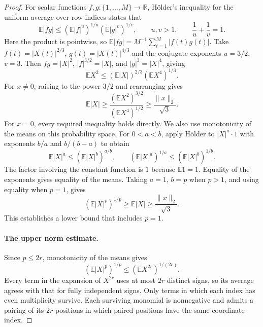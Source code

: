 \documentclass[11pt,letterpaper]{article}
\numberwithin{equation}{section}
\theoremstyle{definition}
\theoremstyle{remark}
\newcommand{\R}{\mathbb R}
\newcommand{\E}{\mathbb E}
\begin{document}
\begin{proof}
For scalar functions $f,g:\{1,\ldots,M\}\to\R$, H\"older's inequality for the uniform average over row indices states that
\[
 \E|fg|\le(\E|f|^u)^{1/u}(\E|g|^v)^{1/v},
 \qquad u,v>1,\qquad \frac1u+\frac1v=1.
\]
Here the product is pointwise, so $\E|fg|=M^{-1}\sum_{t=1}^M|f(t)g(t)|$. Take $f(t)=|X(t)|^{2/3}$, $g(t)=|X(t)|^{4/3}$ and the conjugate exponents $u=3/2$, $v=3$. Then $fg=|X|^2$, $|f|^{3/2}=|X|$, and $|g|^3=|X|^4$, giving
\[
 \E X^2\le(\E|X|)^{2/3}(\E X^4)^{1/3}.
\]
For $x\ne0$, raising to the power $3/2$ and rearranging gives
\[
 \E|X|\ge\frac{(\E X^2)^{3/2}}{(\E X^4)^{1/2}}
 \ge\frac{\|x\|_2}{\sqrt3}.
\]
For $x=0$, every required inequality holds directly. We also use monotonicity of the means on this probability space. For $0<a<b$, apply H\"older to $|X|^a\cdot1$ with exponents $b/a$ and $b/(b-a)$ to obtain
\[
 \E|X|^a\le(\E|X|^b)^{a/b},
 \qquad (\E|X|^a)^{1/a}\le(\E|X|^b)^{1/b}.
\]
The factor involving the constant function is $1$ because $\E1=1$. Equality of the exponents gives equality of the means. Taking $a=1$, $b=p$ when $p>1$, and using equality when $p=1$, gives
\begin{equation}\label{eq:moment-lower}
 (\E|X|^p)^{1/p}\ge\E|X|\ge\frac{\|x\|_2}{\sqrt3}.
\end{equation}
This establishes a lower bound that includes $p=1$.

\paragraph{The upper norm estimate.}
Since $p\le2r$, monotonicity of the means gives
\[
 (\E|X|^p)^{1/p}\le(\E X^{2r})^{1/(2r)}.
\]
Every term in the expansion of $X^{2r}$ uses at most $2r$ distinct signs, so its average agrees with that for fully independent signs. Only terms in which each index has even multiplicity survive. Each surviving monomial is nonnegative and admits a pairing of its $2r$ positions in which paired positions have the same coordinate index.


\end{proof}
\end{document}
